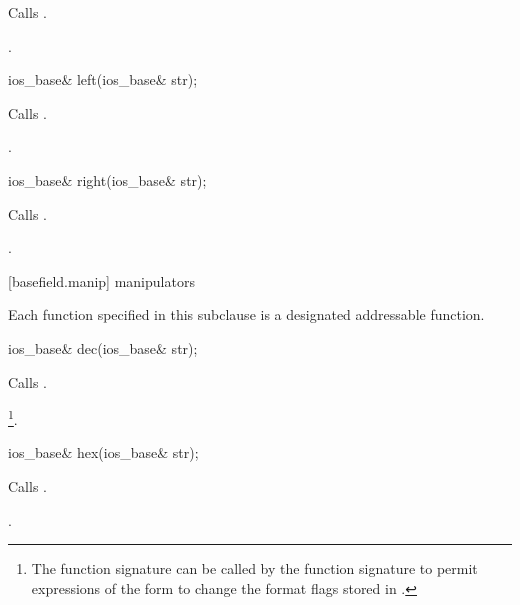 \begin{itemdescr}
\pnum
\effects
Calls
.

\pnum
\returns
{}.
\end{itemdescr}

%
\begin{itemdecl}
ios_base& left(ios_base& str);
\end{itemdecl}

\begin{itemdescr}
\pnum
\effects
Calls
.

\pnum
\returns
{}.
\end{itemdescr}

%
\begin{itemdecl}
ios_base& right(ios_base& str);
\end{itemdecl}

\begin{itemdescr}
\pnum
\effects
Calls
.

\pnum
\returns
{}.
\end{itemdescr}

[basefield.manip]{ manipulators}

\pnum
Each function specified in this subclause
is a designated addressable function.

%
\begin{itemdecl}
ios_base& dec(ios_base& str);
\end{itemdecl}

\begin{itemdescr}
\pnum
\effects
Calls
.

\pnum
\returns
{}\footnote{The function signature
can be called by
the function signature
to permit expressions of the form
to change the format flags stored in
.}.
\end{itemdescr}

%
\begin{itemdecl}
ios_base& hex(ios_base& str);
\end{itemdecl}

\begin{itemdescr}
\pnum
\effects
Calls
.

\pnum
\returns
{}.
\end{itemdescr}


